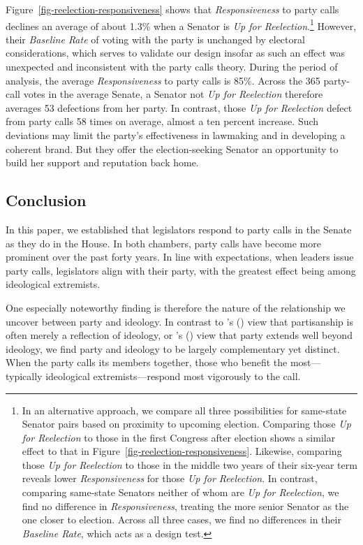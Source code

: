 \documentclass[12pt]{article}
\def\citeapos#1{\citeauthor{#1}'s (\citeyear{#1})} %
\begin{document}
Figure~\ref{fig-reelection-responsiveness} shows that \textit{Responsiveness} to party calls declines an average of about 1.3\% when a Senator is \textit{Up for Reelection}.\footnote{\doublespacing\normalsize  In an alternative approach, we compare all three possibilities for same-state Senator pairs based on proximity to upcoming election.  Comparing those \textit{Up for Reelection} to those in the first Congress after election shows a similar effect to that in Figure~\ref{fig-reelection-responsiveness}.  Likewise, comparing those \textit{Up for Reelection} to those in the middle two years of their six-year term reveals lower \textit{Responsiveness} for those \textit{Up for Reelection}.  In contrast, comparing same-state Senators neither of whom are \textit{Up for Reelection}, we find no difference in \textit{Responsiveness}, treating the more senior Senator as the one closer to election.  Across all three cases, we find no differences in their \textit{Baseline Rate}, which acts as a design test.}  However, their \textit{Baseline Rate} of voting with the party is unchanged by electoral considerations, which serves to validate our design insofar as such an effect was unexpected and inconsistent with the party calls theory.  During the period of analysis, the average \textit{Responsiveness} to party calls is 85\%. Across the 365 party-call votes in the average Senate, a Senator not \textit{Up for Reelection} therefore averages 53 defections from her party.  In contrast, those \textit{Up for Reelection} defect from party calls 58 times on average, almost a ten percent increase.  Such deviations may limit the party's effectiveness in lawmaking and in developing a coherent brand.  But they offer the election-seeking Senator an opportunity to build her support and reputation back home.

\subsection*{Conclusion}

In this paper, we established that legislators respond to party calls in the Senate as they do in the House. In both chambers, party calls have become more prominent over the past forty years.  In line with expectations, when leaders issue party calls, legislators align with their party, with the greatest effect being among ideological extremists.

One especially noteworthy finding is therefore the nature of the relationship we uncover between party and ideology.  In contrast to \citeapos{Krehbiel:1993} view that partisanship is often merely a reflection of ideology, or \citeapos{Lee:2009} view that party extends well beyond ideology, we find party and ideology to be largely complementary yet distinct.  When the party calls its members together, those who benefit the most---typically ideological extremists---respond most vigorously to the call.
\end{document}
